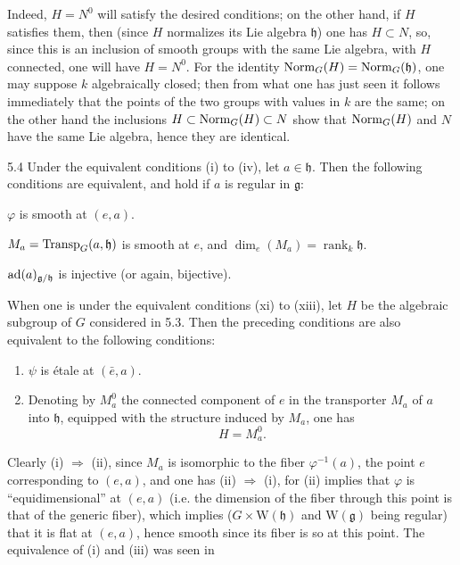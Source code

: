 Indeed, $H=N^0$ will satisfy the desired conditions; on the other
hand, if $H$ satisfies them, then (since $H$ normalizes its Lie
algebra $\mathfrak h$) one has $H\subset N$, so, since this is an
inclusion of smooth groups with the same Lie algebra, with $H$
connected, one will have $H=N^0$. For the identity
$\operatorname{Norm}_G(H)=\operatorname{Norm}_G(\mathfrak h)$, one may suppose $k$ algebraically
closed; then from what one has just seen it follows immediately
that the points of the two groups with values in $k$ are the same;
on the other hand the inclusions $H\subset\operatorname{Norm}_G(H)\subset N$
show that $\operatorname{Norm}_G(H)$ and $N$ have the same Lie algebra, hence
they are identical.

\begin{corollary}{5.4}\label{XIII.5.4}
Under the equivalent conditions (i) to (iv), let $a\in\mathfrak h$.
Then the following conditions are equivalent, and hold if $a$ is
regular in $\mathfrak g$:
\begin{enumeratei}
\item $\varphi$ is smooth at $(e,a)$.
\item $M_a=\operatorname{Transp}_G(a,\mathfrak h)$ is smooth at $e$, and
$\dim_e(M_a)=\operatorname{rank}_k\mathfrak h$.
\item $\operatorname{ad}(a)_{\mathfrak g/\mathfrak h}$ is injective (or again,
bijective).
\end{enumeratei}
When one is under the equivalent conditions (xi) to (xiii), let
$H$ be the algebraic subgroup of $G$ considered in 5.3. Then the
preceding conditions are also equivalent to the following conditions:
\begin{enumerate}[label=\textup{(\roman*)},start=4]
\item $\psi$ is \'etale at $(\bar e,a)$.
\item Denoting by $M_a^0$ the connected component of $e$ in the
transporter $M_a$ of $a$ into $\mathfrak h$, equipped with the
structure induced by $M_a$, one has
\[
 H=M_a^0.
\]
\end{enumerate}
\end{corollary}
Clearly (i) $\Rightarrow$ (ii), since $M_a$ is isomorphic to the
fiber $\varphi^{-1}(a)$, the point $e$ corresponding to $(e,a)$,
and one has (ii) $\Rightarrow$ (i), for (ii) implies that $\varphi$
is ``equidimensional'' at $(e,a)$ (i.e. the dimension of the fiber
through this point is that of the generic fiber), which implies
($G\times\mathrm W(\mathfrak h)$ and $\mathrm W(\mathfrak g)$ being
regular) that it is flat at $(e,a)$, hence smooth since its fiber
is so at this point. The equivalence of (i) and (iii) was seen in
